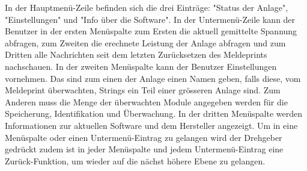 In der Hauptmenü-Zeile befinden sich die drei Einträge: "Status der Anlage", "Einstellungen" und "Info über die Software". In der Untermenü-Zeile kann der Benutzer in der ersten Menüspalte zum Ersten die aktuell gemittelte Spannung abfragen, zum Zweiten die erechnete Leistung der Anlage abfragen und zum Dritten alle Nachrichten seit dem letzten Zurücksetzen des Meldeprints nachschauen. In der zweiten Menüspalte kann der Benutzer Einstellungen vornehmen. Das sind zum einen der Anlage einen Namen geben, falls diese, vom Meldeprint überwachten, Strings ein Teil einer grösseren Anlage sind. Zum Anderen muss die Menge der überwachten Module angegeben werden für die Speicherung, Identifikation und Überwachung. In der dritten Menüspalte werden Informationen zur aktuellen Software und dem Hersteller angezeigt. Um in eine Menüspalte oder einen Untermenü-Eintrag zu gelangen wird der Drehgeber gedrückt zudem ist in jeder Menüspalte und jedem Untermenü-Eintrag eine Zurück-Funktion, um wieder auf die nächst höhere Ebene zu gelangen.
